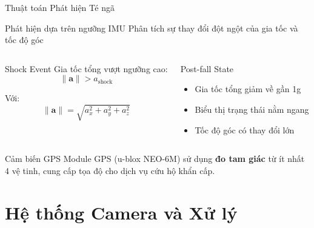 \begin{frame}{Thuật toán Phát hiện Té ngã}
\begin{block}{Phát hiện dựa trên ngưỡng IMU}
Phân tích sự thay đổi đột ngột của gia tốc và tốc độ góc
\end{block}

\begin{columns}
\begin{alertblock}{Shock Event}
Gia tốc tổng vượt ngưỡng cao:
$$\|\mathbf{a}\| > a_{\text{shock}}$$

Với: $$\|\mathbf{a}\| = \sqrt{a_x^2 + a_y^2 + a_z^2}$$
\end{alertblock}

\begin{alertblock}{Post-fall State}
\begin{itemize}
\item Gia tốc tổng giảm về gần 1g
\item Biểu thị trạng thái nằm ngang
\item Tốc độ góc có thay đổi lớn
\end{itemize}
\end{alertblock}
\end{columns}

\vspace{0.5cm}
\begin{exampleblock}{Cảm biến GPS}
Module GPS (u-blox NEO-6M) sử dụng \textbf{đo tam giác} từ ít nhất 4 vệ tinh, cung cấp tọa độ cho dịch vụ cứu hộ khẩn cấp.
\end{exampleblock}
\end{frame}

\section{Hệ thống Camera và Xử lý}

